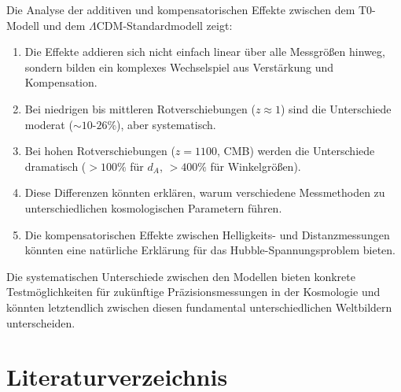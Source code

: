 \documentclass[a4paper,12pt]{article}
\theoremstyle{definition}
\theoremstyle{remark}
\begin{document}
	Die Analyse der additiven und kompensatorischen Effekte zwischen dem T0-Modell und dem $\Lambda$CDM-Standardmodell zeigt:
	
	\begin{enumerate}
		\item Die Effekte addieren sich nicht einfach linear über alle Messgrößen hinweg, sondern bilden ein komplexes Wechselspiel aus Verstärkung und Kompensation.
		
		\item Bei niedrigen bis mittleren Rotverschiebungen ($z \approx 1$) sind die Unterschiede moderat ($\sim10$-$26\%$), aber systematisch.
		
		\item Bei hohen Rotverschiebungen ($z = 1100$, CMB) werden die Unterschiede dramatisch ($>100\%$ für $d_A$, $>400\%$ für Winkelgrößen).
		
		\item Diese Differenzen könnten erklären, warum verschiedene Messmethoden zu unterschiedlichen kosmologischen Parametern führen.
		
		\item Die kompensatorischen Effekte zwischen Helligkeits- und Distanzmessungen könnten eine natürliche Erklärung für das Hubble-Spannungsproblem bieten.
	\end{enumerate}
	
	Die systematischen Unterschiede zwischen den Modellen bieten konkrete Testmöglichkeiten für zukünftige Präzisionsmessungen in der Kosmologie und könnten letztendlich zwischen diesen fundamental unterschiedlichen Weltbildern unterscheiden.
\section{Literaturverzeichnis}
\end{document}
